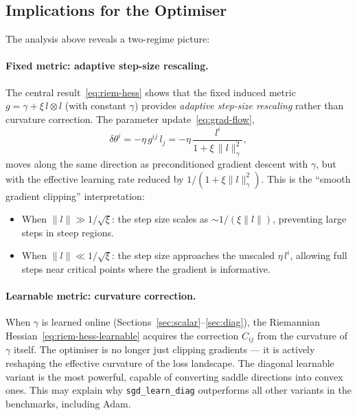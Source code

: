 \documentclass{article}
\begin{document}
\subsection{Implications for the Optimiser}\label{sec:geodesic-implications}

The analysis above reveals a two-regime picture:

\paragraph{Fixed metric: adaptive step-size rescaling.}
The central result~\eqref{eq:riem-hess} shows that the fixed induced metric
$g=\gamma+\xi\,l\otimes l$ (with constant $\gamma$) provides
\emph{adaptive step-size rescaling}
rather than curvature correction.
The parameter update~\eqref{eq:grad-flow},
\begin{equation}
    \delta\theta^i = -\eta\,g^{ij}\,l_j
    = -\eta\,\frac{l^i}{1+\xi\,\|l\|_\gamma^2},
\end{equation}
moves along the same direction as preconditioned gradient descent with $\gamma$,
but with the effective learning rate reduced by $1/(1+\xi\|l\|_\gamma^2)$.
This is the ``smooth gradient clipping'' interpretation:
\begin{itemize}[leftmargin=1.8em]
    \item When $\|l\|\gg 1/\sqrt{\xi}$: the step size scales as $\sim 1/(\xi\|l\|)$,
    preventing large steps in steep regions.
    \item When $\|l\|\ll 1/\sqrt{\xi}$: the step size approaches the unscaled
    $\eta\,l^i$, allowing full steps near critical points where the gradient
    is informative.
\end{itemize}

\paragraph{Learnable metric: curvature correction.}
When $\gamma$ is learned online
(Sections~\ref{sec:scalar}--\ref{sec:diag}),
the Riemannian Hessian~\eqref{eq:riem-hess-learnable}
acquires the correction $C_{ij}$ from the curvature of $\gamma$ itself.
The optimiser is no longer just clipping gradients --- it is actively
reshaping the effective curvature of the loss landscape.
The diagonal learnable variant is the most powerful,
capable of converting saddle directions into convex ones.
This may explain why \texttt{sgd\_learn\_diag}
outperforms all other variants in the benchmarks,
including Adam.
\end{document}
